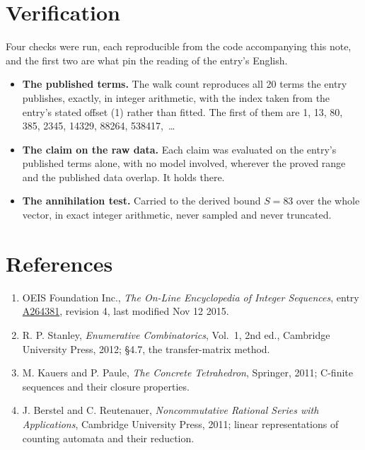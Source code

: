 \documentclass[11pt]{article}
\theoremstyle{definition}
\begin{document}
\section{Verification}

Four checks were run, each reproducible from the code accompanying this note, and the first two are what pin the reading of the entry's English.

\begin{itemize}

\item {\bfseries The published terms.} The walk count reproduces all 20 terms the entry publishes, exactly, in integer arithmetic, with the index taken from the entry's stated offset (1) rather than fitted. The first of them are 1, 13, 80, 385, 2345, 14329, 88264, 538417,~\dots

\item {\bfseries The claim on the raw data.} Each claim was evaluated on the entry's published terms alone, with no model involved, wherever the proved range and the published data overlap. It holds there.

\item {\bfseries The annihilation test.} Carried to the derived bound $S = 83$ over the whole vector, in exact integer arithmetic, never sampled and never truncated.

\end{itemize}

\section{References}

\begin{enumerate}

\item OEIS Foundation Inc., \emph{The On-Line Encyclopedia of Integer Sequences}, entry \href{https://oeis.org/A264381}{A264381}, revision 4, last modified Nov 12 2015.

\item R. P. Stanley, \emph{Enumerative Combinatorics}, Vol.~1, 2nd ed., Cambridge University Press, 2012; \S4.7, the transfer-matrix method.

\item M. Kauers and P. Paule, \emph{The Concrete Tetrahedron}, Springer, 2011; C-finite sequences and their closure properties.

\item J. Berstel and C. Reutenauer, \emph{Noncommutative Rational Series with Applications}, Cambridge University Press, 2011; linear representations of counting automata and their reduction.

\end{enumerate}
\end{document}
